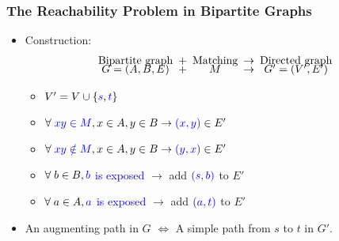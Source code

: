 \documentclass[pdftex]{beamer}
\newcommand{\subbullet}{\color{mypurple}\scriptsize\ding{235}}
\newcommand{\blue}[1]{\textcolor{blue}{#1}}
\begin{document}
\begin{frame} \frametitle{The Reachability Problem in Bipartite
    Graphs}
  \vspace{-1.5ex}
  \begin{itemize}
  \item Construction:
    \vspace{-2ex}
    \[
    \begin{array} {c!{+}c!{\rightarrow}c}
      \text{Bipartite graph} & \text{Matching} & \text{Directed graph}\\[-4pt]
      G = (A, B, E) & M & G' = (V', E')
    \end{array}
    \]
    \vspace{-3ex}
    \begin{itemize}
    \item[\subbullet] $V' = V \cup \{\blue{s}, \blue{t}\}$
    \item[\subbullet] $\forall \; \blue{xy \in M}, x \in A, y \in B
      \rightarrow \blue{(x,y)} \in E'$ 
    \item[\subbullet] $\forall \; \blue{xy \notin M}, x \in A, y \in B
      \rightarrow \blue{(y,x)} \in E'$ 
    \item[\subbullet] $\forall \; b \in B, \blue{b}$ \blue{is exposed}
      $\rightarrow$ add $\blue{(s,b)}$ to $E'$
    \item[\subbullet] $\forall \; a \in A, \blue{a}$ \blue{is exposed}
      $\rightarrow$ add $\blue{(a,t)}$ to $E'$
    \end{itemize}

    \begin{center}
      
    \end{center}

  \item<2> An augmenting path in $G$ $\Leftrightarrow$ A simple path
    from $s$ to $t$ in $G'$.
  \end{itemize}
\end{frame}
\end{document}
